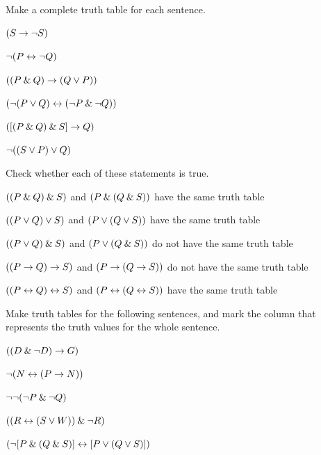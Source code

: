 \begin{small} 
\problempart
Make a complete truth table for each sentence.
\begin{earg}
\item $(S \rightarrow{\neg} S)$ %
\item ${\neg}(P\leftrightarrow {\neg} Q)$ %
\item $((P \mathbin{\&} Q) \rightarrow (Q \vee P))$  %
\item $({\neg}(P \vee Q) \leftrightarrow ({\neg} P \mathbin{\&} {\neg} Q))$ %
\item $([(P \mathbin{\&} Q) \mathbin{\&} S] \rightarrow Q)$ %
\item ${\neg}((S\vee P) \vee Q)$ %
\end{earg}

\problempart
Check whether each of these statements is true.
\begin{earg}
	\item $((P \mathbin{\&} Q) \mathbin{\&} S)$ and $(P \mathbin{\&} (Q \mathbin{\&} S))$ have the same truth table
	\item $((P \vee Q) \vee S)$ and $(P \vee (Q \vee S))$ have the same truth table
	\item $((P \vee Q) \mathbin{\&} S)$ and $(P \vee (Q \mathbin{\&} S))$ do not have the same truth table
	\item $((P \rightarrow Q) \rightarrow S)$ and $(P \rightarrow (Q \rightarrow S))$ do not have the same truth table
	\item $((P \leftrightarrow Q) \leftrightarrow S)$ and $(P \leftrightarrow (Q \leftrightarrow S))$ have the same truth table
\end{earg}

\problempart
Make truth tables for the following sentences, and mark the column that represents the truth values for the whole sentence.

\begin{earg}
\item	$((D \mathbin{\&} {\neg} D) \rightarrow G) $
\item ${\neg} (N \leftrightarrow (P \rightarrow N))$
\item	${\neg} {\neg} ({\neg} P \mathbin{\&} {\neg} Q)  $

\item $((R \leftrightarrow (S \vee W)) \mathbin{\&} {\neg} R)$
\item $({\neg}[P \mathbin{\&} (Q \mathbin{\&} S)] \leftrightarrow [P \vee (Q \vee S)])$


\end{earg}
\end{small}

